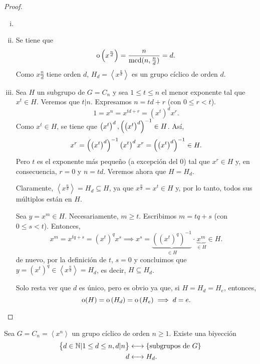 \begin{proof}
    \begin{enumerate}[i)]
        \item[]
        \item Se tiene que
            \[
                \operatorname{o}\left( x^{\frac{n}{d}} \right) = \frac{n}{\operatorname{mcd}(n, \frac{n}{d})} = d.
            \]
            Como $x{\frac{n}{d}}$ tiene orden $d$, $H_d = \left< x^{\frac{n}{d}} \right>$ es un grupo
            cíclico de orden $d$.
        \item Sea $H$ un subgrupo de $G = C_n$ y sea $1 \leq t \leq n$ el menor exponente tal que 
            $x^t \in H$. Veremos que $t \vert n$. Expresamos $n = td + r$ (con $0 \leq r < t$).
            \[
                1 = x^n = x^{td + r} = \left( x^t \right)^d x^r.
            \]
            Como $x^t\in H$, se tiene que $\left( x^t\right)^d, \left( \left( x^t\right)^d \right) ^{-1} \in H$. Así,
            \[
                x^r=\left( \left( x^t\right)^d \right) ^{-1} \left( x^t\right)^d x^r = \left( \left( x^t\right)^d \right) ^{-1} \in H.
            \]
            Pero $t$ es el exponente más pequeño (a excepción del 0) tal que $x^r\in H$ y, en consecuencia, $r = 0$ y $n = td$.
            Veremos ahora que $H = H_d$.
            
            Claramente, $\left< x^{\frac{n}{d}} \right> = H_d \subseteq H$, ya que $x^{\frac{n}{d}} = x^t \in H$
            y, por lo tanto, todos sus múltiplos están en $H$.

            Sea $y = x^m \in H$. Necesariamente, $m\geq t$. Escribimos $m = tq + s$
            (con $0 \leq s < t$). Entonces,
            \[
                x^m = x^{tq + s} = \left( x^t \right)^q x^s \implies
                x^s = \underbrace{\left( \left( x^t \right)^q \right)^{-1}}_{\in H} \cdot
                \underbrace{x^m}_{\in H} \in H.
            \]
            de nuevo, por la definición de $t$, $s = 0$ y concluimos que $y = \left( x^t \right)^q \in 
            \left< x^{\frac{n}{d}} \right> = H_d$, es decir, $H \subseteq H_d$.

            Solo resta ver que $d$ es único, pero es obvio ya que, si $H = H_d = H_e$, entonces,
            \[
                \operatorname{o}(H) = \operatorname{o}\left( H_d \right) = \operatorname{o}\left( H_e \right) \implies
                d = e.
            \]
    \end{enumerate}
\end{proof}

\begin{col}
    Sea $G = C_n = \left< x^n \right>$ un grupo cíclico de orden $n \geq 1$. Existe una biyección
    \[
        \begin{aligned}
            \left\{d \in \mathbb{N} \vert 1 \leq d \leq n, d \vert n \right\} &\longleftrightarrow
            \left\{\text{subgrupos de }G\right\} \\
            d &\longleftrightarrow H_d.
        \end{aligned}
    \]
\end{col}

